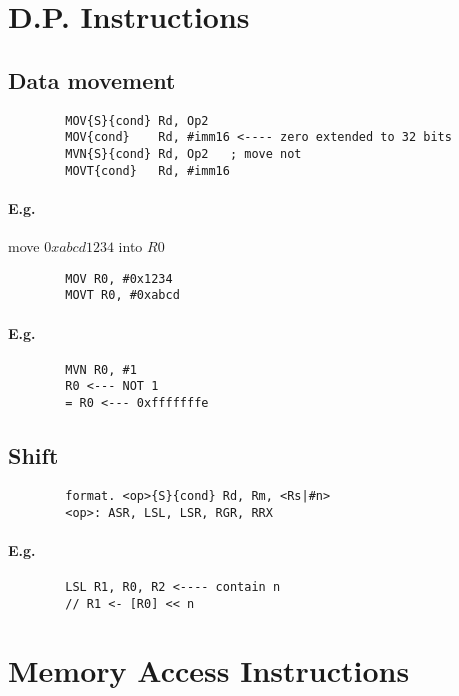 \documentclass[12pt]{report}
\begin{document}
  \section{D.P. Instructions}
    \subsection{Data movement}
      \begin{lstlisting}
        MOV{S}{cond} Rd, Op2
        MOV{cond}    Rd, #imm16 <---- zero extended to 32 bits
        MVN{S}{cond} Rd, Op2   ; move not
        MOVT{cond}   Rd, #imm16
      \end{lstlisting}
      \paragraph{E.g.} move $0xabcd1234$ into $R0$
      \begin{lstlisting}
        MOV R0, #0x1234
        MOVT R0, #0xabcd
      \end{lstlisting}
      \paragraph{E.g.}
      \begin{lstlisting}
        MVN R0, #1
        R0 <--- NOT 1
        = R0 <--- 0xfffffffe
      \end{lstlisting}

    \subsection{Shift}
      \begin{lstlisting}
        format. <op>{S}{cond} Rd, Rm, <Rs|#n>
        <op>: ASR, LSL, LSR, RGR, RRX
      \end{lstlisting}
      \paragraph{E.g.}
      \begin{lstlisting}
        LSL R1, R0, R2 <---- contain n
        // R1 <- [R0] << n
      \end{lstlisting}

  \section{Memory Access Instructions}
\end{document}
